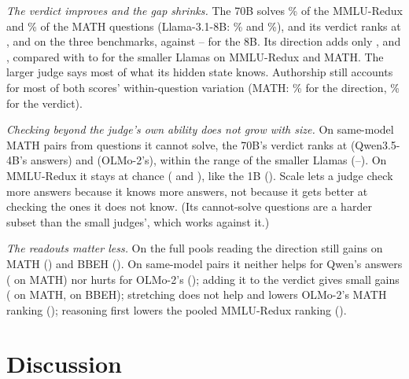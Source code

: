 \documentclass[11pt]{article}
\begin{document}
\emph{The verdict improves and the gap shrinks.} The 70B solves \% of the MMLU-Redux and \% of the MATH questions (Llama-3.1-8B: \% and \%), and its verdict ranks at ,  and  on the three benchmarks, against -- for the 8B. Its direction adds only ,  and , compared with  to  for the smaller Llamas on MMLU-Redux and MATH. The larger judge says most of what its hidden state knows. Authorship still accounts for most of both scores' within-question variation (MATH: \% for the direction, \% for the verdict).

\emph{Checking beyond the judge's own ability does not grow with size.} On same-model MATH pairs from questions it cannot solve, the 70B's verdict ranks at  (Qwen3.5-4B's answers) and  (OLMo-2's), within the range of the smaller Llamas (--). On MMLU-Redux it stays at chance ( and ), like the 1B (). Scale lets a judge check more answers because it knows more answers, not because it gets better at checking the ones it does not know. (Its cannot-solve questions are a harder subset than the small judges', which works against it.)

\emph{The readouts matter less.} On the full pools reading the direction still gains on MATH () and BBEH (). On same-model pairs it neither helps for Qwen's answers ( on MATH) nor hurts for OLMo-2's (); adding it to the verdict gives small gains ( on MATH,  on BBEH); stretching does not help and lowers OLMo-2's MATH ranking (); reasoning first lowers the pooled MMLU-Redux ranking ().

\section{Discussion}
\end{document}

